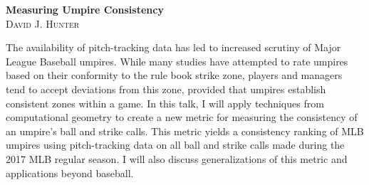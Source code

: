 \documentclass[12pt]{article}
\theoremstyle{definition}
\begin{document}
\begin{center}
\textbf{Measuring Umpire Consistency} \\
\textsc{David J. Hunter}
\end{center}

The availability of pitch-tracking data has led to increased scrutiny of Major League Baseball umpires. While many studies have attempted to rate umpires based on their conformity to the rule book strike zone, players and managers tend to accept deviations from this zone, provided that umpires establish consistent zones within a game. In this talk, I will apply techniques from computational geometry to create a new metric for measuring the consistency of an umpire's ball and strike calls. This metric yields a consistency ranking of MLB umpires using pitch-tracking data on all ball and strike calls made during the 2017 MLB regular season. I will also discuss generalizations of this metric and applications beyond baseball.
\end{document}
